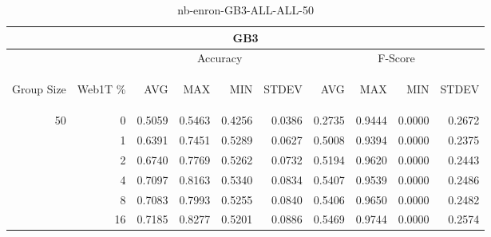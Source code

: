 \begin{center}
\begin{table}[htbp] 
 \begin{center}
\begin{tabular}{ | r | r | r | r | r | r | r | r | r | r |}
\hline
\multicolumn{10}{|c|}{GB3}\\
\hline
 & & \multicolumn{4}{|c|}{Accuracy} & \multicolumn{4}{|c|}{F-Score}\\ \cline{3-10}
\begin{sideways}Group Size\end{sideways} & \begin{sideways}Web1T \%\end{sideways} & \begin{sideways}AVG\end{sideways} & \begin{sideways}MAX\end{sideways} & \begin{sideways}MIN\end{sideways} & \begin{sideways}STDEV\end{sideways} & \begin{sideways}AVG\end{sideways} & \begin{sideways}MAX\end{sideways} & \begin{sideways}MIN\end{sideways} & \begin{sideways}STDEV\end{sideways}\\
\hline
\multirow{5}{*}{50}
 & 0 & 0.5059 & 0.5463 & 0.4256 & 0.0386 & 0.2735 & 0.9444 & 0.0000 & 0.2672\\ \cline{2-10}
 & 1 & 0.6391 & 0.7451 & 0.5289 & 0.0627 & 0.5008 & 0.9394 & 0.0000 & 0.2375\\ \cline{2-10}
 & 2 & 0.6740 & 0.7769 & 0.5262 & 0.0732 & 0.5194 & 0.9620 & 0.0000 & 0.2443\\ \cline{2-10}
 & 4 & 0.7097 & 0.8163 & 0.5340 & 0.0834 & 0.5407 & 0.9539 & 0.0000 & 0.2486\\ \cline{2-10}
 & 8 & 0.7083 & 0.7993 & 0.5255 & 0.0840 & 0.5406 & 0.9650 & 0.0000 & 0.2482\\ \cline{2-10}
 & 16 & 0.7185 & 0.8277 & 0.5201 & 0.0886 & 0.5469 & 0.9744 & 0.0000 & 0.2574\\ \cline{2-10}
\hline
\end{tabular}
\caption{nb-enron-GB3-ALL-ALL-50}
\label{table:nb-enron-GB3-ALL-ALL-50}
\end{center}
 \end{table}
\end{center}

